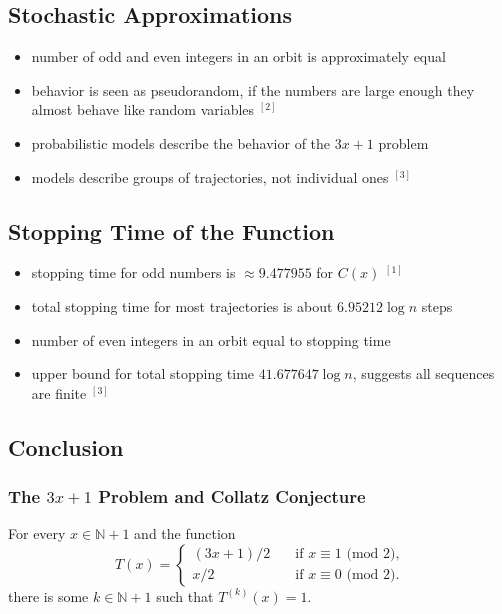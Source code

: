 \documentclass[12pt, a4paper, reqno]{amsart}
\begin{document}
\subsection{Stochastic Approximations}

\begin{itemize}
    \item number of odd and even integers in an orbit is approximately equal
    \item behavior is seen as pseudorandom, if the numbers are large enough 
        they almost behave like random variables $^{[2]}$
    \item probabilistic models describe the behavior of the $3x+1$ problem
    \item models describe groups of trajectories, not individual ones $^{[3]}$
\end{itemize}

\subsection{Stopping Time of the Function}

\begin{itemize}
    \item stopping time for odd numbers is $\approx 9.477955$ for $C(x)$ $^{[1]}$
    \item total stopping time for most trajectories is about $6.95212 \log n$ steps
    \item number of even integers in an orbit equal to stopping time
    \item upper bound for total stopping time $41.677647 \log n$, suggests all
        sequences are finite $^{[3]}$
\end{itemize}

\subsection{Conclusion}

\subsubsection{The $3x+1$ Problem and Collatz Conjecture}

For every $x \in \mathbb{N} + 1$ and the function
\begin{equation}
T(x)= \left\{
    \begin{array}{ll}
        (3x+1)/2 \quad &\text{if } x \equiv 1 \text{ (mod 2),} \\
        x/2 \quad &\text{if } x \equiv 0 \text{ (mod 2).}
    \end{array}
\right.
\end{equation}
there is some $k \in \mathbb{N} + 1$ such that $T^{(k)}(x)=1$.
\end{document}
